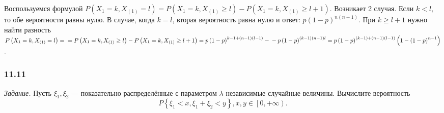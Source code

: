 Воспользуемся формулой 
$P \left( X_1 = k, X_{ \left( 1 \right) } = l \right) =
P \left( X_1 = k, X_{ \left( 1 \right) } \geq l \right) - P \left( X_1 = k, X_{ \left( 1 \right) } \geq l + 1 \right) $.
Возникает 2 случая.
Если $k < l$, то обе вероятности равны нулю.
В случае, когда $k = l$, вторая вероятность равна нулю и ответ: $p \left( 1-p \right)^{n \left( n-1 \right) }$.
При $k \geq l + 1$ нужно найти разность
$P \left( X_1 = k, X_{ \left( 1 \right) } = l \right) = \\
= P \left( X_1 = k, X_{ \left( 1 \right) } \geq l \right) - P \left( X_1 = k, X_{ \left( 1 \right) } \geq l + 1 \right) =
p \left( 1-p \right)^{k-1 + \left( n-1 \right) \left( l-1 \right) } - \\
- p \left( 1-p \right)^{ \left( k-1 \right) \left( n-1 \right) l} =
p \left( 1-p \right)^{ \left( k-1 \right) + \left( n-1 \right) \left( l-1 \right) } \left( 1- \left( 1-p \right)^{n-1} \right)$.

\subsubsection*{11.11}

\textit{Задание.} Пусть $ \xi_1, \xi_2$ --- показательно распределённые с параметром $ \lambda $ независимые случайные величины.
Вычислите вероятность
$$P \left\{ \xi_1 < x, \xi_1 + \xi_2 < y \right\},
x, y \in \left[ 0, + \infty \right).$$

